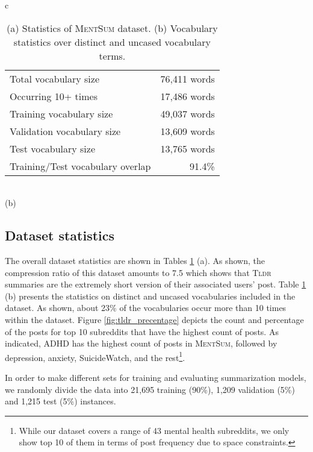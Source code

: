 \documentclass[10pt, a4paper]{article}
\newcommand{\tldr}{\textsc{Tldr}}
\newcommand{\mentsum}{\textsc{MentSum}}
\begin{document}
\begin{table}
\begin{tabular}{c}
    \begin{tabular}{lr}
    \toprule
     Total vocabulary size & 76,411 words\\
     Occurring 10+ times & 17,486 words\\
     Training vocabulary size & 49,037 words\\
     Validation vocabulary size & 13,609 words\\
     Test vocabulary size & 13,765 words\\
     
     Training/Test vocabulary overlap & 91.4\%\\
     \bottomrule
     
    \end{tabular}
    
        \vspace{0.7em}  
         \\
         (b)
\end{tabular}
    
    
    \caption{(a) Statistics of \mentsum{} dataset. (b) Vocabulary statistics over distinct and uncased vocabulary terms. }
    \label{tab:mentsum_stat}
\end{table}

\subsection{Dataset statistics}

The overall dataset statistics are shown in Tables \ref{tab:mentsum_stat} (a). As shown, the compression ratio of this dataset amounts to 7.5 which shows that \tldr{} summaries are the extremely short version of their associated users' post. Table \ref{tab:mentsum_stat} (b) presents the statistics on distinct and uncased vocabularies included in the dataset. As shown, about 23\% of the vocabularies occur more than 10 times within the dataset. Figure \ref{fig:tldr_precentage} depicts the count and percentage of the posts for top 10 subreddits that have the highest count of posts. As indicated, {\selectfont ADHD} has the highest count of posts in \mentsum{}, followed by {\selectfont depression}, {\selectfont anxiety}, {\selectfont SuicideWatch}, and the rest\footnote{While our dataset covers a range of 43 mental health subreddits, we only show top 10 of them in terms of post frequency due to space constraints.}. 

In order to make different sets for training and evaluating summarization models, we randomly divide the data into 21,695 training (90\%), 1,209 validation (5\%) and 1,215 test (5\%) instances.
\end{document}
